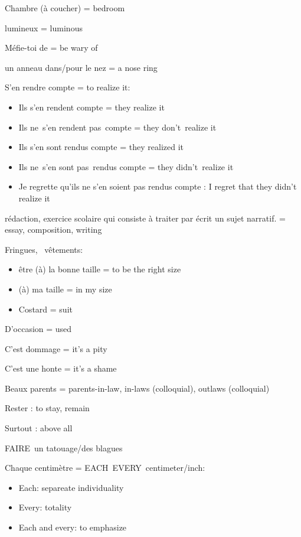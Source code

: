 Chambre (à coucher) = bedroom~

lumineux = luminous

Méfie-toi de = be wary of~

un anneau dans/pour le nez = a nose ring

S'en rendre compte = to realize it:

\begin{itemize}
\item
  Ils s'en rendent compte = they realize it
\item
  Ils ne~s'en rendent pas~compte = they don't~realize it
\item
  Ils s'en sont rendus compte = they realized it
\item
  Ils ne~s'en sont pas~rendus compte = they didn't~realize it
\item
  Je regrette qu'ils ne s'en soient pas rendus compte : I regret that
  they didn't realize it
\end{itemize}

rédaction, exercice scolaire qui consiste à traiter par écrit un sujet
narratif. = essay, composition, writing

Fringues,~ vêtements:

\begin{itemize}
\item
  être (à) la bonne taille = to be the right size
\item
  (à) ma taille = in my size
\item
  Costard = suit
\end{itemize}

D'occasion = used

C'est dommage = it's a pity~

C'est une honte = it's a shame~~

Beaux parents = parents-in-law, in-laws (colloquial), outlaws
(colloquial)

Rester : to stay, remain~

Surtout : above all~

FAIRE~un tatouage/des blagues~

Chaque centimètre = {EACH~}EVERY~centimeter/inch:

\begin{itemize}
\item
  Each: separeate individuality
\item
  Every: totality
\item
  Each and every: to emphasize~
\end{itemize}

